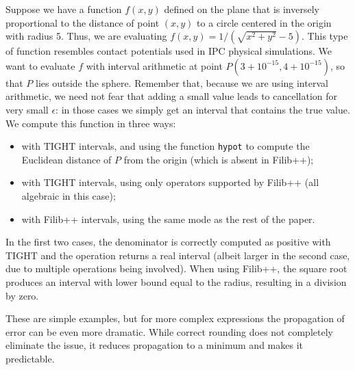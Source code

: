 Suppose we have a function $f(x,y)$ defined on the plane that is inversely proportional to the distance of point $(x,y)$ to a circle centered in the origin with radius 5.
Thus, we are evaluating $f(x,y) = 1/(\sqrt{x^2 + y^2}-5)$.
This type of function resembles contact potentials used in IPC physical simulations.
We want to evaluate $f$ with interval arithmetic at point $P(3+10^{-15},4+10^{-15})$, so that $P$ lies outside the sphere. Remember that, because we are using interval arithmetic, we need not fear that adding a small value leads to cancellation for very small $\epsilon$: in those cases we simply get an interval that contains the true value.
We compute this function in three ways:
\begin{itemize}
	\item with TIGHT intervals, and using the function \texttt{hypot} to compute the Euclidean distance of $P$ from the origin (which is absent in Filib++);
	\item with TIGHT intervals, using only operators supported by Filib++ (all algebraic in this case);
	\item with Filib++ intervals, using the same mode as the rest of the paper.
\end{itemize}
In the first two cases, the denominator is correctly computed as positive with TIGHT and the operation returns a real interval (albeit larger in the second case, due to multiple operations being involved).
When using Filib++, the square root produces an interval with lower bound equal to the radius, resulting in a division by zero.


These are simple examples, but for more complex expressions the propagation of error can be even more dramatic. While correct rounding does not completely eliminate the issue, it reduces propagation to a minimum and makes it predictable.

%
